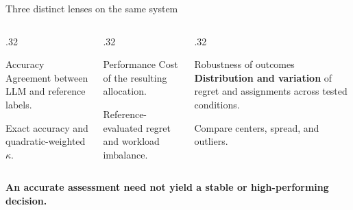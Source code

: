 \documentclass[aspectratio=169,11pt]{beamer}
\newcommand{\key}[1]{\textcolor{deepblue}{\textbf{#1}}}
\begin{document}
\begin{frame}{Three distinct lenses on the same system}

\begin{columns}[T,onlytextwidth]

\begin{column}{.32\textwidth}

\begin{block}{Accuracy}
\small
Agreement between LLM and reference labels.

\vspace{6pt}

Exact accuracy and quadratic-weighted $\kappa$.
\end{block}

\end{column}

\begin{column}{.32\textwidth}

\begin{block}{Performance}
\small
Cost of the resulting allocation.

\vspace{6pt}

Reference-evaluated regret and workload imbalance.
\end{block}

\end{column}

\begin{column}{.32\textwidth}

\begin{block}{Robustness of outcomes}
\small
\textbf{Distribution and variation} of regret and assignments across tested conditions.

\vspace{6pt}

Compare centers, spread, and outliers.
\end{block}

\end{column}

\end{columns}

\vspace{.35cm}

\centering
\key{An accurate assessment need not yield a stable or high-performing decision.}

\end{frame}
\end{document}
